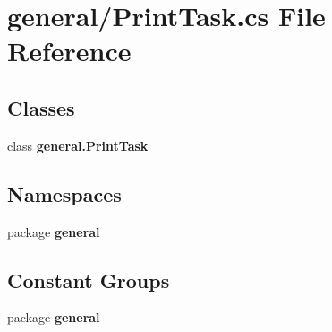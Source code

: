 \section{general/\-Print\-Task.cs File Reference}
\label{_print_task_8cs}
\subsection*{Classes}
\begin{DoxyCompactItemize}
\item 
class {\bf general.\-Print\-Task}
\end{DoxyCompactItemize}
\subsection*{Namespaces}
\begin{DoxyCompactItemize}
\item 
package {\bf general}
\end{DoxyCompactItemize}
\subsection*{Constant Groups}
\begin{DoxyCompactItemize}
\item 
package {\bf general}
\end{DoxyCompactItemize}
